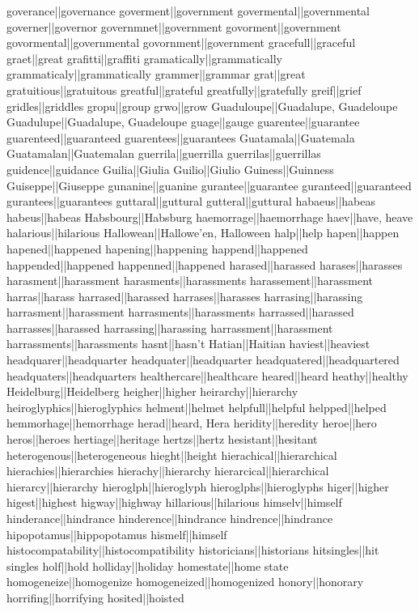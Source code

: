 goverance||governance
goverment||government
govermental||governmental
governer||governor
governmnet||government
govorment||government
govormental||governmental
govornment||government
gracefull||graceful
graet||great
grafitti||graffiti
gramatically||grammatically
grammaticaly||grammatically
grammer||grammar
grat||great
gratuitious||gratuitous
greatful||grateful
greatfully||gratefully
greif||grief
gridles||griddles
gropu||group
grwo||grow
Guaduloupe||Guadalupe, Guadeloupe
Guadulupe||Guadalupe, Guadeloupe
guage||gauge
guarentee||guarantee
guarenteed||guaranteed
guarentees||guarantees
Guatamala||Guatemala
Guatamalan||Guatemalan
guerrila||guerrilla
guerrilas||guerrillas
guidence||guidance
Guilia||Giulia
Guilio||Giulio
Guiness||Guinness
Guiseppe||Giuseppe
gunanine||guanine
gurantee||guarantee
guranteed||guaranteed
gurantees||guarantees
guttaral||guttural
gutteral||guttural
habaeus||habeas
habeus||habeas
Habsbourg||Habsburg
haemorrage||haemorrhage
haev||have, heave
halarious||hilarious
Hallowean||Hallowe'en, Halloween
halp||help
hapen||happen
hapened||happened
hapening||happening
happend||happened
happended||happened
happenned||happened
harased||harassed
harases||harasses
harasment||harassment
harasments||harassments
harassement||harassment
harras||harass
harrased||harassed
harrases||harasses
harrasing||harassing
harrasment||harassment
harrasments||harassments
harrassed||harassed
harrasses||harassed
harrassing||harassing
harrassment||harassment
harrassments||harassments
hasnt||hasn't
Hatian||Haitian
haviest||heaviest
headquarer||headquarter
headquater||headquarter
headquatered||headquartered
headquaters||headquarters
healthercare||healthcare
heared||heard
heathy||healthy
Heidelburg||Heidelberg
heigher||higher
heirarchy||hierarchy
heiroglyphics||hieroglyphics
helment||helmet
helpfull||helpful
helpped||helped
hemmorhage||hemorrhage
herad||heard, Hera
heridity||heredity
heroe||hero
heros||heroes
hertiage||heritage
hertzs||hertz
hesistant||hesitant
heterogenous||heterogeneous
hieght||height
hierachical||hierarchical
hierachies||hierarchies
hierachy||hierarchy
hierarcical||hierarchical
hierarcy||hierarchy
hieroglph||hieroglyph
hieroglphs||hieroglyphs
higer||higher
higest||highest
higway||highway
hillarious||hilarious
himselv||himself
hinderance||hindrance
hinderence||hindrance
hindrence||hindrance
hipopotamus||hippopotamus
hismelf||himself
histocompatability||histocompatibility
historicians||historians
hitsingles||hit singles
holf||hold
holliday||holiday
homestate||home state
homogeneize||homogenize
homogeneized||homogenized
honory||honorary
horrifing||horrifying
hosited||hoisted
